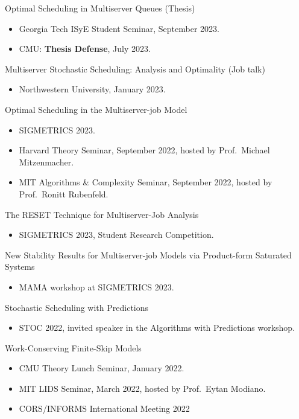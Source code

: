 \documentclass{res}
\begin{document}
\begin{resume}
    Optimal Scheduling in Multiserver Queues (Thesis)
    \begin{itemize}
        \item Georgia Tech ISyE Student Seminar, September 2023.
        \item CMU: \textbf{Thesis Defense}, July 2023.
    \end{itemize}

    Multiserver Stochastic Scheduling: Analysis and Optimality (Job talk)
    \begin{itemize}
        \item Northwestern University, January 2023.
    \end{itemize}

    Optimal Scheduling in the Multiserver-job Model
    \begin{itemize}
        \item SIGMETRICS 2023.
        \item Harvard Theory Seminar, September 2022, hosted by Prof.~Michael Mitzenmacher.
        \item MIT Algorithms \& Complexity Seminar, September 2022, hosted by Prof.~Ronitt Rubenfeld.
    \end{itemize}

    The RESET Technique for Multiserver-Job Analysis
    \begin{itemize}
        \item SIGMETRICS 2023, Student Research Competition. 
    \end{itemize}

    New Stability Results for Multiserver-job Models via Product-form Saturated Systems
    \begin{itemize}
        \item MAMA workshop at SIGMETRICS 2023.
    \end{itemize}

    Stochastic Scheduling with Predictions
    \begin{itemize}
        \item STOC 2022, invited speaker in the Algorithms with Predictions workshop.
    \end{itemize}

    Work-Conserving Finite-Skip Models
    \begin{itemize}
        \item CMU Theory Lunch Seminar, January 2022.
        \item MIT LIDS Seminar, March 2022, hosted by Prof.~Eytan Modiano.
        \item CORS/INFORMS International Meeting 2022
    \end{itemize}


\end{resume}
\end{document}
